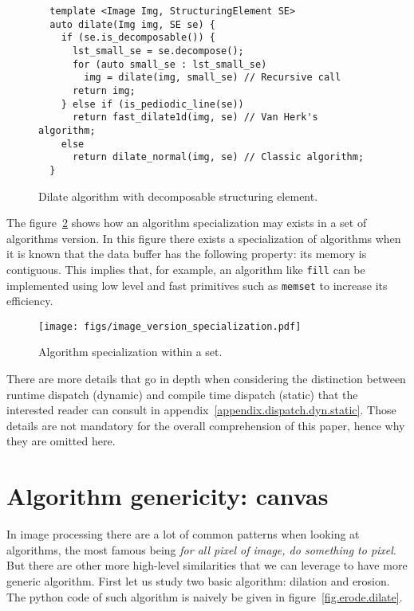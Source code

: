 \begin{figure}[tbh]
  \centering
  \begin{verbatim}
  template <Image Img, StructuringElement SE>
  auto dilate(Img img, SE se) {
    if (se.is_decomposable()) {
      lst_small_se = se.decompose();
      for (auto small_se : lst_small_se)
        img = dilate(img, small_se) // Recursive call
      return img;
    } else if (is_pediodic_line(se))
      return fast_dilate1d(img, se) // Van Herk's algorithm;
    else
      return dilate_normal(img, se) // Classic algorithm;
  }
  \end{verbatim}

  \caption{Dilate algorithm with decomposable structuring element.}
  \label{fig.decomp.dilate}
\end{figure}

The figure~\ref{fig.image.specialization} shows how an algorithm specialization may exists in a set of algorithms
version. In this figure there exists a specialization of algorithms when it is known that the data buffer has the
following property: its memory is contiguous. This implies that, for example, an algorithm like \texttt{fill} can be
implemented using low level and fast primitives such as \texttt{memset} to increase its efficiency.

\begin{figure}[tbh]
  \centering
  \texttt{[image: figs/image\_version\_specialization.pdf]}
  \caption{Algorithm specialization within a set.}
  \label{fig.image.specialization}
\end{figure}

There are more details that go in depth when considering the distinction between runtime dispatch (dynamic) and
compile time dispatch (static) that the interested reader can consult in appendix~\ref{appendix.dispatch.dyn.static}.
Those details are not mandatory for the overall comprehension of this paper, hence why they are omitted here.


\chapter{Algorithm genericity: canvas}
\label{sec.algo}

In image processing there are a lot of common patterns when looking at algorithms, the most famous being \emph{for all
  pixel of image, do something to pixel}. But there are other more high-level similarities that we can leverage to have
more generic algorithm. First let us study two basic algorithm: dilation and erosion. The python code of such algorithm
is naively be given in figure~\ref{fig.erode.dilate}.

